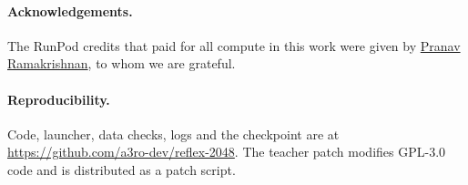 \documentclass{article}
\begin{document}
\paragraph{Acknowledgements.}
The RunPod credits that paid for all compute in this work were given by \href{https://www.linkedin.com/in/pranavram98/}{Pranav Ramakrishnan}, to whom we are grateful.

\paragraph{Reproducibility.}
Code, launcher, data checks, logs and the checkpoint are at \url{https://github.com/a3ro-dev/reflex-2048}. The teacher patch modifies GPL-3.0 code and is distributed as a patch script.



\end{document}
